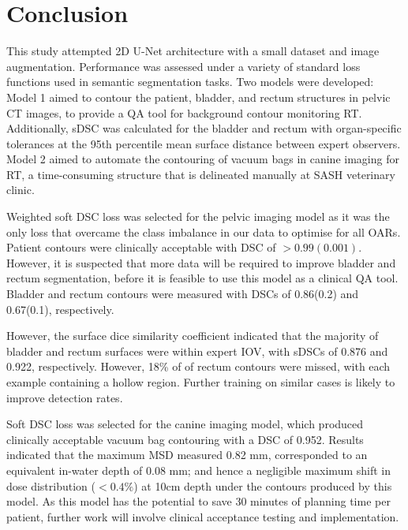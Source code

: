 \chapter{Conclusion}
\label{ch:conclusion}

This study attempted 2D U-Net architecture with a small dataset and image augmentation. Performance was assessed under a variety of standard loss functions used in semantic segmentation tasks. Two models were developed: Model 1 aimed to contour the patient, bladder, and rectum structures in pelvic CT images, to provide a QA tool for background contour monitoring RT. Additionally, sDSC was calculated for the bladder and rectum with organ-specific tolerances at the 95th percentile mean surface distance between expert observers. Model 2 aimed to automate the contouring of vacuum bags in canine imaging for RT, a time-consuming structure that is delineated manually at SASH veterinary clinic.

Weighted soft DSC loss was selected for the pelvic imaging model as it was the only loss that overcame the class imbalance in our data to optimise for all OARs. Patient contours were clinically acceptable with DSC of $>0.99(0.001)$. However, it is suspected that more data will be required to improve bladder and rectum segmentation, before it is feasible to use this model as a clinical QA tool. Bladder and rectum contours were measured with DSCs of 0.86(0.2) and 0.67(0.1), respectively.

However, the surface dice similarity coefficient indicated that the majority of bladder and rectum surfaces were within expert IOV, with sDSCs of 0.876 and 0.922, respectively. However, 18\% of of rectum contours were missed, with each example containing a hollow region. Further training on similar cases is likely to improve detection rates.

Soft DSC loss was selected for the canine imaging model, which produced clinically 
acceptable vacuum bag contouring with a DSC of 0.952. Results indicated that the maximum MSD measured 0.82 mm, corresponded to an equivalent in-water depth of 0.08 mm; and hence a negligible maximum shift in dose distribution ($<0.4\%$) at 10cm depth under the contours produced by this model. As this model has the potential to save 30 minutes of planning time per patient, further work will involve clinical acceptance testing and implementation.


